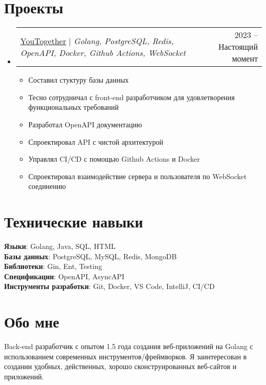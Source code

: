 \documentclass[letterpaper,11pt]{article}
\makeatletter
\newcommand{\resumeItem}[1]{
  \item\small{
    {#1 \vspace{-2pt}}
  }
}
\newcommand{\resumeProjectHeading}[2]{
    \item
    \begin{tabular*}{0.97\textwidth}{l@{\extracolsep{\fill}}r}
      \small#1 & #2 \\
    \end{tabular*}\vspace{-7pt}
}
\newcommand{\resumeSubHeadingListStart}{\begin{itemize}[leftmargin=0.15in, label={}]}
\newcommand{\resumeSubHeadingListEnd}{\end{itemize}}
\newcommand{\resumeItemListStart}{\begin{itemize}}
\newcommand{\resumeItemListEnd}{\end{itemize}\vspace{-5pt}}
\makeatother
\begin{document}
\section{Проекты}
\resumeSubHeadingListStart
\resumeProjectHeading
{\href{https://github.com/youtogether-online}{\underline{YouTogether}} $|$ \emph{Golang, PostgreSQL, Redis, OpenAPI, Docker, Github Actions, WebSocket}}{2023 -- Настоящий момент}
\resumeItemListStart
\resumeItem{Составил стуктуру базы данных}
\resumeItem{Тесно сотрудничал с front-end разработчиком для удовлетворения функциональных требований}
\resumeItem{Разработал OpenAPI документацию}
\resumeItem{Спроектировал API с чистой архитектурой}
\resumeItem{Управлял CI/CD с помощью Github Actions и Docker}
\resumeItem{Спроектировал взаимодействие сервера и пользователя по WebSocket соединению}
\resumeItemListEnd
\resumeSubHeadingListEnd

\section{Технические навыки}
\begin{itemize}[leftmargin=0.15in, label={}]
	\small{\item{
		\textbf{Языки}{: Golang, Java, SQL, HTML} \\
		\textbf{Базы данных}{: PostgreSQL, MySQL, Redis, MongoDB} \\
		\textbf{Библиотеки}{: Gin, Ent, Testing} \\
		\textbf{Спецификации}{: OpenAPI, AsyncAPI} \\
		\textbf{Инструменты разработки}{: Git, Docker, VS Code, IntelliJ, CI/CD} \\
	}}
\end{itemize}

\section{Обо мне}
\begin{itemize}[leftmargin=0.15in, label={}]
\small{\item{Back-end разработчик с опытом 1.5 года создания веб-приложений на Golang с использованием современных инструментов/фреймворков. Я заинтересован в создании удобных, действенных, хорошо сконструированных веб-сайтов и приложений.} \
}
\end{itemize}

\end{document}

